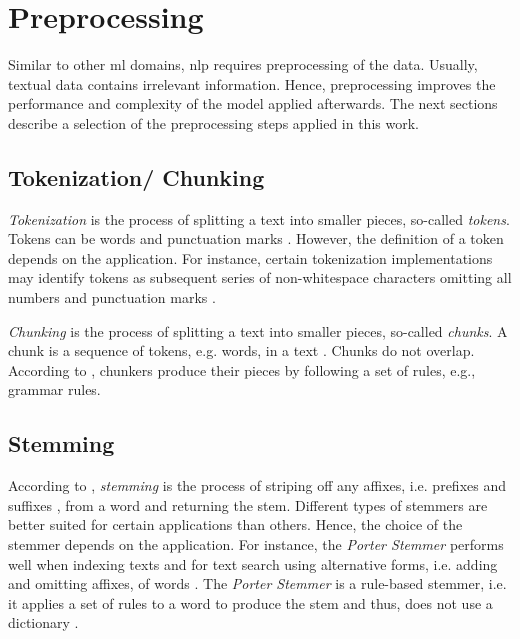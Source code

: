 \section{Preprocessing}\label{sec:preprocessing}

Similar to other \ac{ml} domains, \ac{nlp} requires preprocessing of the data.
Usually, textual data contains irrelevant information.
Hence, preprocessing improves the performance and complexity of the model applied afterwards.
The next sections describe a selection of the preprocessing steps applied in this work.


\subsection{Tokenization/ Chunking}\label{subsec:tokenization}

\textit{Tokenization} is the process of splitting a text into smaller pieces, so-called \textit{tokens}.
Tokens can be words and punctuation marks \cite{nlp-book2009}.
However, the definition of a token depends on the application.
For instance, certain tokenization implementations may identify tokens as subsequent series of non-whitespace characters omitting all numbers and punctuation marks \cite{IR2011}.

\textit{Chunking} is the process of splitting a text into smaller pieces, so-called \textit{chunks}.
A chunk is a sequence of tokens, e.g. words, in a text \cite{nlp-book2009}.
Chunks do not overlap.
According to \citeauthor{nlp-book2009}, chunkers produce their pieces by following a set of rules, e.g., grammar rules.

\subsection{Stemming}\label{subsec:stemming}

According to \citeauthor{nlp-book2009}, \textit{stemming} is the process of striping off any affixes, i.e. prefixes and suffixes \cite{IR2011}, from a word and returning the stem.
Different types of stemmers are better suited for certain applications than others.
Hence, the choice of the stemmer depends on the application.
For instance, the \textit{Porter Stemmer} performs well when indexing texts and for text search using alternative forms, 
i.e. adding and omitting affixes, of words \cite{nlp-book2009}.
The \textit{Porter Stemmer} is a rule-based stemmer, i.e. it applies a set of rules to a word to produce the stem and thus, does not use a dictionary \cite{IR2011}.

